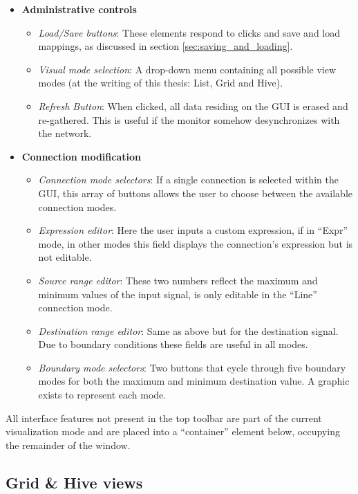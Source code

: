 \begin{itemize}
	\item \textbf{Administrative controls}
	\begin{itemize}
		\item\emph{Load/Save buttons}: These elements respond to clicks and save and load mappings, as discussed in section \ref{sec:saving_and_loading}.
		\item\emph{Visual mode selection}: A drop-down menu containing all possible view modes (at the writing of this thesis: List, Grid and Hive).
		\item\emph{Refresh Button}: When clicked, all data residing on the GUI is erased and re-gathered. This is useful if the monitor somehow desynchronizes with the network.
	\end{itemize}

	\item \textbf{Connection modification}
	\begin{itemize}
		\item\emph{Connection mode selectors}: If a single connection is selected within the GUI, this array of buttons allows the user to choose between the available connection modes.
		\item\emph{Expression editor}: Here the user inputs a custom expression, if in ``Expr'' mode, in other modes this field displays the connection's expression but is not editable.
		\item\emph{Source range editor}: These two numbers reflect the maximum and minimum values of the input signal, is only editable in the ``Line'' connection mode.
		\item\emph{Destination range editor}: Same as above but for the destination signal. Due to boundary conditions these fields are useful in all modes.
		\item\emph{Boundary mode selectors}: Two buttons that cycle through five boundary modes for both the maximum and minimum destination value. A graphic exists to represent each mode.
	\end{itemize}
\end{itemize}

All interface features not present in the top toolbar are part of the current visualization mode and are placed into a ``container'' element below, occupying the remainder of the window.


	\subsection{Grid \& Hive views} %
	\label{sec:grid_&_hive_views}


